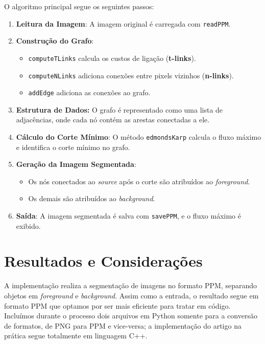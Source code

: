 \documentclass[12pt]{article}
\begin{document}
O algoritmo principal segue os seguintes passos:
\begin{enumerate}
    \item \textbf{Leitura da Imagem}: A imagem original é carregada com \texttt{readPPM}.
    \item \textbf{Construção do Grafo}:
        \begin{itemize}
            \item \texttt{computeTLinks} calcula os custos de ligação (\textbf{t-links}).
            \item \texttt{computeNLinks} adiciona conexões entre pixels vizinhos (\textbf{n-links}).
            \item \texttt{addEdge} adiciona as conexões ao grafo.
        \end{itemize}
        \item \textbf{Estrutura de Dados:} O grafo é representado como uma lista de adjacências, onde cada nó contém as arestas conectadas a ele.
    \item \textbf{Cálculo do Corte Mínimo}: O método \texttt{edmondsKarp} calcula o fluxo máximo e identifica o corte mínimo no grafo.
    \item \textbf{Geração da Imagem Segmentada}:
        \begin{itemize}
            \item Os nós conectados ao \textit{source} após o corte são atribuídos ao \textit{foreground}.
            \item Os demais são atribuídos ao \textit{background}.
        \end{itemize}
    \item \textbf{Saída}: A imagem segmentada é salva com \texttt{savePPM}, e o fluxo máximo é exibido.
\end{enumerate}

\section*{Resultados e Considerações}

A implementação realiza a segmentação de imagens no formato PPM, separando objetos em \textit{foreground} e \textit{background}. Assim como a entrada, o resultado segue em formato PPM que optamos por ser mais eficiente para tratar em código. Incluímos durante o processo dois arquivos em Python somente para a conversão de formatos, de PNG para PPM e vice-versa; a implementação do artigo na prática segue totalmente em linguagem C++.
\end{document}
